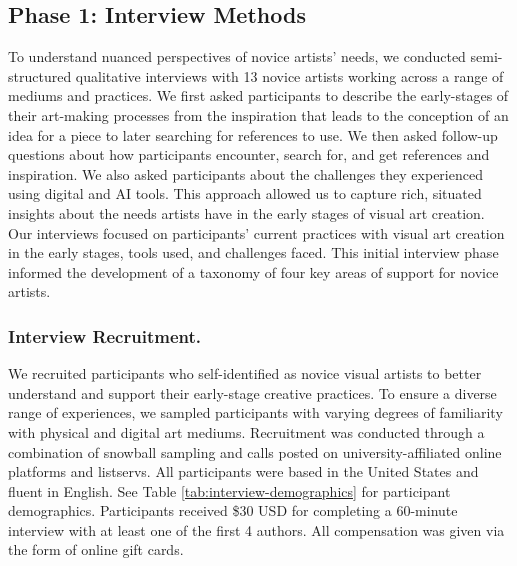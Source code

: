 \subsection{Phase 1: Interview Methods} \label{interview} 
To understand nuanced perspectives of novice artists' needs, we conducted semi-structured qualitative interviews with 13 novice artists working across a range of mediums and practices. We first asked participants to describe the early-stages of their art-making processes from the inspiration that leads to the conception of an idea for a piece to later searching for references to use. We then asked follow-up questions about how participants encounter, search for, and get references and inspiration. We also asked participants about the challenges they experienced using digital and AI tools. This approach allowed us to capture rich, situated insights about the needs artists have in the early stages of visual art creation. Our interviews focused on participants' current practices with visual art creation in the early stages, tools used, and challenges faced. This initial interview phase informed the development of a taxonomy of four key areas of support for novice artists.



\subsubsection{Interview Recruitment.}
We recruited participants who self-identified as novice visual artists to better understand and support their early-stage creative practices. To ensure a diverse range of experiences, we sampled participants with varying degrees of familiarity with physical and digital art mediums. Recruitment was conducted through a combination of snowball sampling and calls posted on university-affiliated online platforms and listservs. All participants were based in the United States and fluent in English. See Table \ref{tab:interview-demographics} for participant demographics. Participants received \$30 USD for completing a 60-minute interview with at least one of the first 4 authors. All compensation was given via the form of online gift cards.

